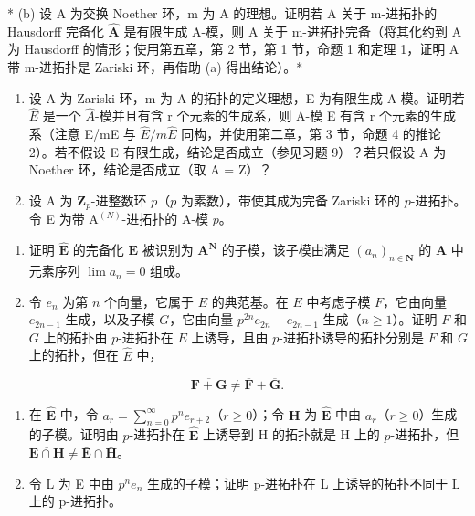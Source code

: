 * (b) 设 A 为交换 Noether 环，m 为 A 的理想。证明若 A 关于 m-进拓扑的 Hausdorff 完备化 \(\hat{\mathbf{A}}\) 是有限生成 A-模，则 A 关于 m-进拓扑完备（将其化约到 A 为 Hausdorff 的情形；使用第五章，第 2 节，第 1 节，命题 1 和定理 1，证明 A 带 m-进拓扑是 Zariski 环，再借助 (a) 得出结论）。*

\begin{enumerate}
\def\labelenumi{\arabic{enumi}.}
\setcounter{enumi}{9}
\item
  设 A 为 Zariski 环，m 为 A 的拓扑的定义理想，E 为有限生成 A-模。证明若 \(\hat{E}\) 是一个 \(\hat{A}\)-模并且有含 r 个元素的生成系，则 A-模 E 有含 r 个元素的生成系（注意 E/mE 与 \(\hat{E}/m\hat{E}\) 同构，并使用第二章，第 3 节，命题 4 的推论 2）。若不假设 E 有限生成，结论是否成立（参见习题 9）？若只假设 A 为 Noether 环，结论是否成立（取 A = Z）？~
\item
  设 A 为 \(\mathbf{Z}_p\)-进整数环 \(p\)（\(p\) 为素数），带使其成为完备 Zariski 环的 \(p\)-进拓扑。令 E 为带 \(\mathrm{A}^{(N)}\)-进拓扑的 A-模 \(p\)。
\end{enumerate}

\begin{enumerate}
\def\labelenumi{(\alph{enumi})}
\item
  证明 \(\hat{\mathbf{E}}\) 的完备化 \(\mathbf{E}\) 被识别为 \(\mathbf{A}^{\mathbf{N}}\) 的子模，该子模由满足 \((a_{n})_{n\in \mathbf{N}}\) 的 \(\mathbf{A}\) 中元素序列 \(\lim a_n = 0\) 组成。
\item
   令 \(e_n\) 为第 \(n\) 个向量，它属于 \(E\) 的典范基。在 \(E\) 中考虑子模 \(F\)，它由向量 \(e_{2n-1}\) 生成，以及子模 \(G\)，它由向量 \(p^{2n}e_{2n} - e_{2n-1}\) 生成（\(n \geqslant 1\)）。证明 \(F\) 和 \(G\) 上的拓扑由 \(p\)-进拓扑在 \(E\) 上诱导，且由 \(p\)-进拓扑诱导的拓扑分别是 \(F\) 和 \(G\) 上的拓扑，但在 \(\hat{E}\) 中，
\end{enumerate}

\[
\overline {{{\mathbf {F} + \mathbf {G}}}} \neq \overline {{{\mathbf {F}}}} + \overline {{{\mathbf {G}}}}.
\]

\begin{enumerate}
\def\labelenumi{(\alph{enumi})}
\setcounter{enumi}{2}
\item
   在 \(\hat{\mathbf{E}}\) 中，令 \(a_{r} = \sum_{n=0}^{\infty} p^{n} e_{r+2}\)（\(r \geqslant 0\)）；令 \(\mathbf{H}\) 为 \(\hat{\mathbf{E}}\) 中由 \(a_{r}\)（\(r \geqslant 0\)）生成的子模。证明由 \(p\)-进拓扑在 \(\hat{\mathbf{E}}\) 上诱导到 H 的拓扑就是 H 上的 \(p\)-进拓扑，但 \(\overline{\mathbf{E} \cap \mathbf{H}} \neq \bar{\mathbf{E}} \cap \bar{\mathbf{H}}\)。
\item
  令 L 为 E 中由 \(p^{n}e_{n}\) 生成的子模；证明 p-进拓扑在 L 上诱导的拓扑不同于 L 上的 p-进拓扑。
\end{enumerate}

